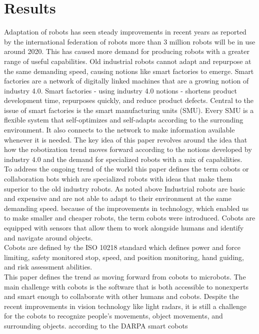 \documentclass[a4paper, 11pt]{article}
\begin{document}
\section{Results}
Adaptation of robots has seen steady improvements in recent years as reported
by the international federation of robots more than 3 million robots will be
in use around 2020. This has caused more demand for producing robots with a
greater range of useful capabilities. Old industrial robots cannot adapt and
repurpose at the same demanding speed, causing notions like smart factories to
emerge. Smart factories are a network of digitally linked machines that are a
growing notion of industry 4.0. Smart factories - using industry 4.0
notions - shortens product development time, repurposes quickly, and
reduce product defects. Central to the issue of smart factories is the
smart manufacturing units (SMU). Every SMU is a flexible system that
self-optimizes and self-adapts according to the surronding environment. It also
connects to the network to make information available whenever it is needed.
The key idea of this paper revolves around the idea that how the robotization
trend moves forward according to the notions developed by industry 4.0 and
the demand for specialized robots with a mix of capabilities. \\
To address the ongoing trend of the world this paper defines the term cobots
or collaboration bots which are specialized robots with ideas that make them
superior to the old industry robots. As noted above Industrial robots are basic
and expensive and are not able to adapt to their environment at the same
demanding speed. because of the improvements in technology, which enabled us
to make smaller and cheaper robots, the term cobots were introduced. Cobots are 
equipped with sensors that allow them to work alongside humans and
identify and navigate around objects. \\
Cobots are defined by the ISO 10218 standard which defines power and force
limiting, safety monitored stop, speed, and position monitoring, hand guiding,
and risk assessment abilities. \\
This paper defines the trend as moving forward from cobots to microbots.
The main challenge with cobots is the software that is both accessible to
nonexperts and smart enough to collaborate with other humans and cobots.
Despite the recent improvements in vision technology like light radars, it is
still a challenge for the cobots to recognize people's movements,
object movements, and surrounding objects. according to the DARPA smart cobots
\end{document}
